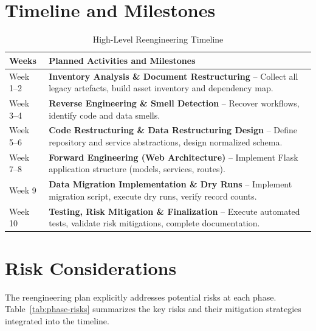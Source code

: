 \section{Timeline and Milestones}

\begin{table}[h]
  \centering
  \caption{High-Level Reengineering Timeline}
  \begin{tabular}{p{2.2cm} p{10.0cm}}
    \toprule
    \textbf{Weeks} & \textbf{Planned Activities and Milestones} \\
    \midrule
    Week 1--2 &
      \textbf{Inventory Analysis \& Document Restructuring} --
      Collect all legacy artefacts, build asset inventory and dependency map. \\
    Week 3--4 &
      \textbf{Reverse Engineering \& Smell Detection} --
      Recover workflows, identify code and data smells. \\
    Week 5--6 &
      \textbf{Code Restructuring \& Data Restructuring Design} --
      Define repository and service abstractions, design normalized schema. \\
    Week 7--8 &
      \textbf{Forward Engineering (Web Architecture)} --
      Implement Flask application structure (models, services, routes). \\
    Week 9 &
      \textbf{Data Migration Implementation \& Dry Runs} --
      Implement migration script, execute dry runs, verify record counts. \\
    Week 10 &
      \textbf{Testing, Risk Mitigation \& Finalization} --
      Execute automated tests, validate risk mitigations, complete documentation. \\
    \bottomrule
  \end{tabular}
\end{table}

\section{Risk Considerations}

The reengineering plan explicitly addresses potential risks at each phase.
Table~\ref{tab:phase-risks} summarizes the key risks and their mitigation
strategies integrated into the timeline.

